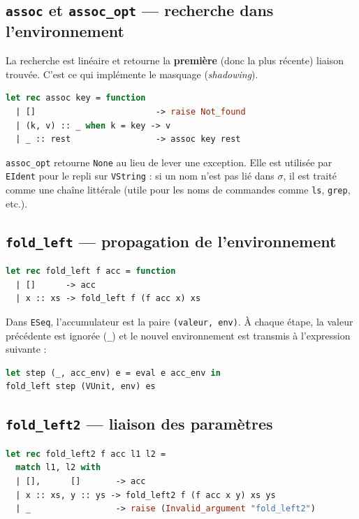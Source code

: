 \documentclass[11pt,a4paper]{article}
\begin{document}
\subsection{\texttt{assoc} et \texttt{assoc\_opt} --- recherche dans l'environnement}

La recherche est linéaire et retourne la \textbf{première} (donc la plus récente)
liaison trouvée. C'est ce qui implémente le masquage (\textit{shadowing}).

\begin{lstlisting}[language=ml]
let rec assoc key = function
  | []                        -> raise Not_found
  | (k, v) :: _ when k = key -> v
  | _ :: rest                 -> assoc key rest
\end{lstlisting}

\texttt{assoc\_opt} retourne \texttt{None} au lieu de lever une exception.
Elle est utilisée par \texttt{EIdent} pour le repli sur \texttt{VString} :
si un nom n'est pas lié dans $\sigma$, il est traité comme une chaîne littérale
(utile pour les noms de commandes comme \texttt{ls}, \texttt{grep}, etc.).

\subsection{\texttt{fold\_left} --- propagation de l'environnement}

\begin{lstlisting}[language=ml]
let rec fold_left f acc = function
  | []      -> acc
  | x :: xs -> fold_left f (f acc x) xs
\end{lstlisting}

Dans \texttt{ESeq}, l'accumulateur est la paire \texttt{(valeur, env)}.
À chaque étape, la valeur précédente est ignorée (\texttt{\_}) et le
nouvel environnement est transmis à l'expression suivante :

\begin{lstlisting}[language=ml]
let step (_, acc_env) e = eval e acc_env in
fold_left step (VUnit, env) es
\end{lstlisting}

\subsection{\texttt{fold\_left2} --- liaison des paramètres}

\begin{lstlisting}[language=ml]
let rec fold_left2 f acc l1 l2 =
  match l1, l2 with
  | [],      []       -> acc
  | x :: xs, y :: ys -> fold_left2 f (f acc x y) xs ys
  | _                 -> raise (Invalid_argument "fold_left2")
\end{lstlisting}
\end{document}
